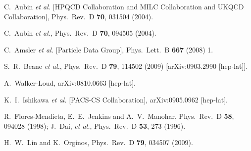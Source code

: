 \documentclass[twocolumn,nofootinbib,prd,aps,superscriptaddress,tightenlines]{revtex4}
\begin{document}
\begin{thebibliography}{99}
  C.~Aubin {\it et al.}  [HPQCD Collaboration and MILC Collaboration and
                  UKQCD Collaboration],
  Phys.\ Rev.\  D {\bf 70}, 031504 (2004).

  C.~Aubin {\it et al.},
  Phys.\ Rev.\  D {\bf 70}, 094505 (2004).

C.~Amsler {\it et al.}  [Particle Data Group],
  Phys.\ Lett.\  B {\bf 667} (2008) 1.

  S.~R.~Beane {\it et al.},
  Phys.\ Rev.\  D {\bf 79}, 114502 (2009)
  [arXiv:0903.2990 [hep-lat]].

  A.~Walker-Loud,
  arXiv:0810.0663 [hep-lat].
  
  K.~I.~Ishikawa {\it et al.}  [PACS-CS Collaboration],
  arXiv:0905.0962 [hep-lat].

  R.~Flores-Mendieta, E.~E.~Jenkins and A.~V.~Manohar,
  Phys.\ Rev.\  D {\bf 58}, 094028 (1998);
   J.~Dai, {\sl et al.},
  Phys.\ Rev.\  D {\bf 53}, 273 (1996).


  H.~W.~Lin and K.~Orginos,
  Phys.\ Rev.\  D {\bf 79}, 034507 (2009).


\end{thebibliography}
\end{document}

